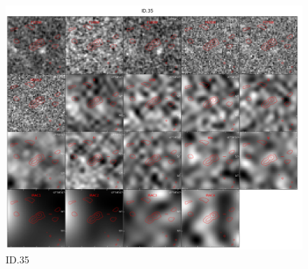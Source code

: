 \begin{figure}[tbp]
\centering \includegraphics[width=160mm]{Matched/ASPECS_Cutout_34.jpg}
\caption{ID.35}
\label{fig:Match_Three}
\end{figure}
